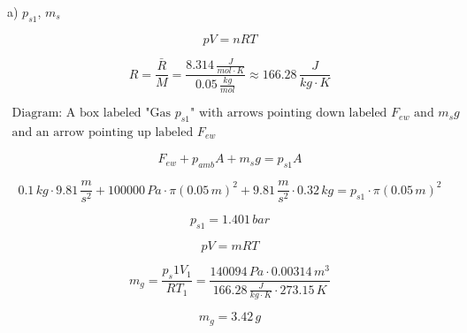 a) $p_{s1}$, $m_s$

\[
pV = nRT
\]

\[
R = \frac{\bar{R}}{M} = \frac{8.314 \, \frac{J}{mol \cdot K}}{0.05 \, \frac{kg}{mol}} \approx 166.28 \, \frac{J}{kg \cdot K}
\]


\[
\begin{array}{c}
\text{Diagram: A box labeled "Gas $p_{s1}$" with arrows pointing down labeled $F_{ew}$ and $m_s g$} \\
\text{and an arrow pointing up labeled $F_{ew}$}
\end{array}
\]

\[
F_{ew} + p_{amb} A + m_s g = p_{s1} A
\]

\[
0.1 \, kg \cdot 9.81 \, \frac{m}{s^2} + 100000 \, Pa \cdot \pi (0.05 \, m)^2 + 9.81 \, \frac{m}{s^2} \cdot 0.32 \, kg = p_{s1} \cdot \pi (0.05 \, m)^2
\]

\[
p_{s1} = 1.401 \, bar
\]


\[
pV = mRT
\]

\[
m_g = \frac{p_s1 V_1}{R T_1} = \frac{140094 \, Pa \cdot 0.00314 \, m^3}{166.28 \, \frac{J}{kg \cdot K} \cdot 273.15 \, K}
\]

\[
m_g = 3.42 \, g
\]